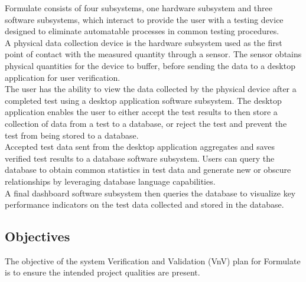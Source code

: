 \documentclass[12pt, titlepage]{article}
\begin{document}

  Formulate consists of four subsystems, one hardware subsystem and three software subsystems, which interact to provide the user with a testing device designed to eliminate automatable processes in common testing procedures.\\

  A physical data collection device is the hardware subsystem used as the first point of contact with the measured quantity through a sensor. The sensor obtains physical quantities for the device to buffer, before sending the data to a desktop application for user verification.\\

  The user has the ability to view the data collected by the physical device after a completed test using a desktop application software subsystem. The desktop application enables the user to either accept the test results to then store a collection of data from a test to a database, or reject the test and prevent the test from being stored to a database.\\

  Accepted test data sent from the desktop application aggregates and saves verified test results to a database software subsystem. Users can query the database to obtain common statistics in test data and generate new or obscure relationships by leveraging database language capabilities.\\

  A final dashboard software subsystem then queries the database to visualize key performance indicators on the test data collected and stored in the database.\newpage





\subsection{Objectives}


  The objective of the system Verification and Validation (VnV) plan for Formulate is to ensure the intended project qualities are present.\\
\end{document}
